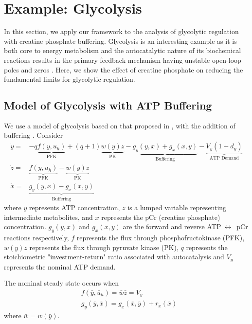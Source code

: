 \documentclass[letterpaper, 10 pt,  conference]{ieeeconf}  %
\begin{document}
\section{Example: Glycolysis}\label{sect:exam}

In this section, we apply our framework to the analysis of glycolytic regulation with creatine phosphate buffering. Glycolysis is an interesting example as it is both core to energy metabolism \cite{BERTS07} and the autocatalytic nature of its biochemical reactions results in the primary feedback mechanism having unstable open-loop poles and zeros \cite{CHABD11}. Here, we show the effect of creatine phosphate on reducing the fundamental limits for glycolytic regulation.

\subsection{Model of Glycolysis with ATP Buffering}

We use a model of glycolysis based on that proposed in \cite{CHABD11}, with the addition of buffering \cite{HANAPS17}. Consider 
\begin{equation*}
\begin{aligned}
\dot{y}=&-q\underbrace{f(y,u_h)}_{\text{PFK}}+(q+1)\underbrace{w(y)z}_{\text{PK}}
-\underbrace{g_y(y,x)+g_x(x,y)}_{\text{Buffering}}-\underbrace{V_y (1+d_y)}_{\text{ATP Demand}}\\
\dot{z}=&\underbrace{f(y,u_h)}_{\text{PFK}}-\underbrace{w(y)z}_{\text{PK}}\\
\dot{x}=&\underbrace{g_y(y,x)-g_x(x,y)}_{\text{Buffering}}
\end{aligned}
\end{equation*}
where $y$ represents ATP concentration, $z$ is a lumped variable representing intermediate metabolites, and $x$ represents the pCr (creatine phosphate) concentration. $g_y(y,x)$ and $g_x(x,y)$ are the forward and reverse ATP$~\leftrightarrow$~pCr reactions respectively, $f$ represents the flux through phosphofructokinase (PFK), $w(y)z$ represents the flux through pyruvate kinase (PK), $q$ represents the stoichiometric "investment-return" ratio associated with autocatalysis and $V_y$ represents the nominal ATP demand.

The nominal steady state occurs when
\begin{equation*}
\begin{aligned}
&f(\bar y,\bar{u}_h)=\bar{w}\bar z=V_y\\
&g_y(\bar y,\bar x)=g_x(\bar x,\bar y)+r_x(\bar x)
\end{aligned}
\end{equation*}
where $\bar{w}=w(\bar{y})$.
\end{document}
